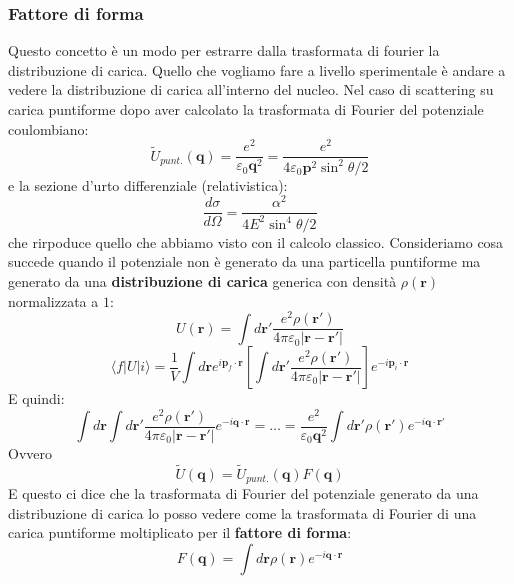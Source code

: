 \subsubsection{Fattore di forma}
Questo concetto è un modo per estrarre dalla trasformata di fourier la distribuzione di carica. Quello che vogliamo fare a livello sperimentale è andare a vedere la distribuzione di carica all'interno del nucleo. Nel caso di scattering su carica puntiforme dopo aver calcolato la trasformata di Fourier del potenziale coulombiano:
\begin{equation*}
    \tilde{U}_{punt.}(\mathbf{q})=\frac{e^2}{\varepsilon_0\mathbf{q}^2}=\frac{e^2}{4\varepsilon_0\mathbf{p}^2\sin^2\theta/2}
\end{equation*}
e la sezione d'urto differenziale (relativistica):
\begin{equation*}
    \frac{d\sigma}{d\Omega}=\frac{\alpha^2}{4E^2\sin^4\theta/2}
\end{equation*}
che rirpoduce quello che abbiamo visto con il calcolo classico. Consideriamo cosa succede quando il potenziale non è generato da una particella puntiforme ma generato da una \textbf{distribuzione di carica} generica con densità $\rho(\mathbf{r})$ normalizzata a $1$:
\begin{equation*}
    U(\mathbf{r})=\int d\mathbf{r}'\frac{e^2\rho(\mathbf{r}')}{4\pi\varepsilon_0|\mathbf{r}-\mathbf{r}'|}
\end{equation*}
\begin{equation*}
    \langle f|U|i\rangle=\frac{1}{V}\int d\mathbf{r}e^{i\mathbf{p}_f\cdot\mathbf{r}}\left[\int d\mathbf{r}'\frac{e^2\rho(\mathbf{r}')}{4\pi\varepsilon_0|\mathbf{r}-\mathbf{r}'|}\right]e^{-i\mathbf{p}_i\cdot\mathbf{r}}
\end{equation*}
E quindi:
\begin{equation*}
    \int d\mathbf{r}\int d\mathbf{r}'\frac{e^2\rho(\mathbf{r}')}{4\pi\varepsilon_0|\mathbf{r}-\mathbf{r}'|}e^{-i\mathbf{q}\cdot\mathbf{r}}=\ldots=\frac{e^2}{\varepsilon_0\mathbf{q}^2}\int d\mathbf{r}'\rho(\mathbf{r}')e^{-i\mathbf{q}\cdot\mathbf{r}'}
\end{equation*}
Ovvero 
\begin{equation*}
    \tilde{U}(\mathbf{q})=\tilde{U}_{punt.}(\mathbf{q})F(\mathbf{q})
\end{equation*}
E questo ci dice che la trasformata di Fourier del potenziale generato da una distribuzione di carica lo posso vedere come la trasformata di Fourier di una carica puntiforme moltiplicato per il \textbf{fattore di forma}:
\begin{equation*}
    F(\mathbf{q})=\int d\mathbf{r}\rho(\mathbf{r})e^{-i\mathbf{q}\cdot\mathbf{r}}
\end{equation*}
